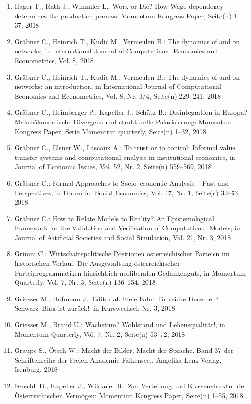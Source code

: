 \begin{enumerate}
	 \item Hager T., Rath J., Wimmler L.: Work or Die? How Wage dependency determines the production process: Momentum Kongress Paper, Seite(n) 1--37, 2018
	 \item Gräbner C., Heinrich T., Kudic M., Vermeulen B.: The dynamics of and on networks, in International Journal of Computational Economics and Econometrics, Vol. 8, 2018
	 \item Gräbner C., Heinrich T., Kudic M., Vermeulen B.: The dynamics of and on networks: an introduction, in International Journal of Computational Economics and Econometrics, Vol. 8, Nr. 3/4, Seite(n) 229--241, 2018
	 \item Gräbner C., Heimberger P., Kapeller J., Schütz B.: Desintegration in Europa? Makroökonomische Divergenz und strukturelle Polarisierung: Momentum Kongress Paper, Serie Momentum quarterly, Seite(n) 1--32, 2018
	 \item Gräbner C., Elsner W., Lascaux A.: To trust or to control: Informal value transfer systems and computational analysis in institutional economics, in Journal of Economic Issues, Vol. 52, Nr. 2, Seite(n) 559--569, 2018
	 \item Gräbner C.: Formal Approaches to Socio--economic Analysis -- Past and Perspectives, in Forum for Social Economics, Vol. 47, Nr. 1, Seite(n) 32--63, 2018
	 \item Gräbner C.: How to Relate Models to Reality? An Epistemological Framework for the Validation and Verification of Computational Models, in Journal of Artificial Societies and Social Simulation, Vol. 21, Nr. 3, 2018
	 \item Grimm C.: Wirtschaftspolitische Positionen österreichischer Parteien im historischen Verlauf. Die Ausgestaltung österreichischer Parteiprogrammatiken hinsichtlich neoliberalen Gedankenguts, in Momentum Quarterly, Vol. 7, Nr. 3, Seite(n) 136--154, 2018
	 \item Griesser M., Hofmann J.: Editorial: Freie Fahrt für reiche Burschen? Schwarz--Blau ist zurück!, in Kurswechsel, Nr. 3, 2018
	 \item Griesser M., Brand U.: Wachstum? Wohlstand und Lebensqualität!, in Momentum Quarterly, Vol. 7, Nr. 2, Seite(n) 53--72, 2018
	 \item Graupe S., Ötsch W.: Macht der Bilder, Macht der Sprache. Band 37 der Schriftenreihe der Freien Akademie Falkensee., Angelika Lenz Verlag, Isenburg, 2018
	 \item Ferschli B., Kapeller J., Wildauer R.: Zur Verteilung und Klassenstruktur der Österreichischen Vermögen: Momentum Kongress Paper, Seite(n) 1--55, 2018

\end{enumerate}

